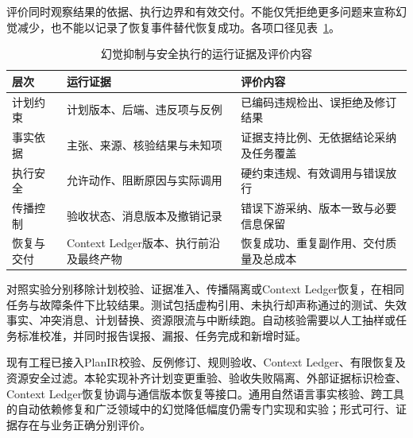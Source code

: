 评价同时观察结果的依据、执行边界和有效交付。不能仅凭拒绝更多问题来宣称幻觉减少，也不能以记录了恢复事件替代恢复成功。各项口径见表~\ref{tab:mechanism_observation}。

\begin{table}[htbp]
\centering
\caption{幻觉抑制与安全执行的运行证据及评价内容}
\label{tab:mechanism_observation}
\begin{tabular}{p{}p{}p{}}
\toprule
层次 & 运行证据 & 评价内容 \\
\midrule
计划约束 & 计划版本、后端、违反项与反例 & 已编码违规检出、误拒绝及修订结果 \\
事实依据 & 主张、来源、核验结果与未知项 & 证据支持比例、无依据结论采纳及任务覆盖 \\
执行安全 & 允许动作、阻断原因与实际调用 & 硬约束违规、有效调用与错误放行 \\
传播控制 & 验收状态、消息版本及撤销记录 & 错误下游采纳、版本一致与必要信息保留 \\
恢复与交付 & Context Ledger版本、执行前沿及最终产物 & 恢复成功、重复副作用、交付质量及总成本 \\
\bottomrule
\end{tabular}
\end{table}

对照实验分别移除计划校验、证据准入、传播隔离或Context Ledger恢复，在相同任务与故障条件下比较结果。测试包括虚构引用、未执行却声称通过的测试、失效事实、冲突消息、计划替换、资源限流与中断续跑。自动核验需要以人工抽样或任务标准校准，并同时报告误报、漏报、任务完成和新增时延。

现有工程已接入PlanIR校验、反例修订、规则验收、Context Ledger、有限恢复及资源安全过滤。本轮实现补齐计划变更重验、验收失败隔离、外部证据标识检查、Context Ledger恢复协调与通信版本恢复等接口。通用自然语言事实核验、跨工具的自动依赖修复和广泛领域中的幻觉降低幅度仍需专门实现和实验；形式可行、证据存在与业务正确分别评价。

